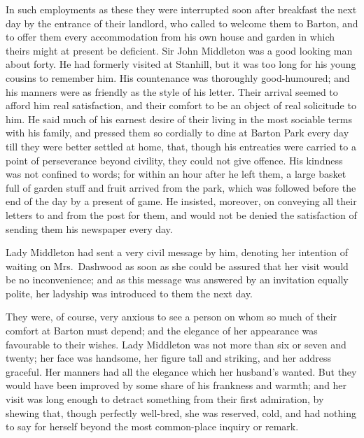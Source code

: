 \documentclass{article}
\begin{document}
In such employments as these they were interrupted
soon after breakfast the next day by the entrance of
their landlord, who called to welcome them to Barton,
and to offer them every accommodation from his own house
and garden in which theirs might at present be deficient.
Sir John Middleton was a good looking man about forty.
He had formerly visited at Stanhill, but it was too long
for his young cousins to remember him.  His countenance
was thoroughly good-humoured; and his manners were
as friendly as the style of his letter.  Their arrival
seemed to afford him real satisfaction, and their comfort
to be an object of real solicitude to him.  He said much
of his earnest desire of their living in the most sociable
terms with his family, and pressed them so cordially
to dine at Barton Park every day till they were better
settled at home, that, though his entreaties were carried
to a point of perseverance beyond civility, they could
not give offence.  His kindness was not confined to words;
for within an hour after he left them, a large basket
full of garden stuff and fruit arrived from the park,
which was followed before the end of the day by a present
of game.  He insisted, moreover, on conveying all their
letters to and from the post for them, and would not be
denied the satisfaction of sending them his newspaper
every day.

Lady Middleton had sent a very civil message by him,
denoting her intention of waiting on Mrs.\ Dashwood as soon as
she could be assured that her visit would be no inconvenience;
and as this message was answered by an invitation
equally polite, her ladyship was introduced to them the next day.

They were, of course, very anxious to see a person on
whom so much of their comfort at Barton must depend; and the
elegance of her appearance was favourable to their wishes.
Lady Middleton was not more than six or seven and twenty;
her face was handsome, her figure tall and striking,
and her address graceful.  Her manners had all the elegance
which her husband's wanted.  But they would have been
improved by some share of his frankness and warmth;
and her visit was long enough to detract something from
their first admiration, by shewing that, though perfectly
well-bred, she was reserved, cold, and had nothing to say
for herself beyond the most common-place inquiry or remark.
\end{document}
